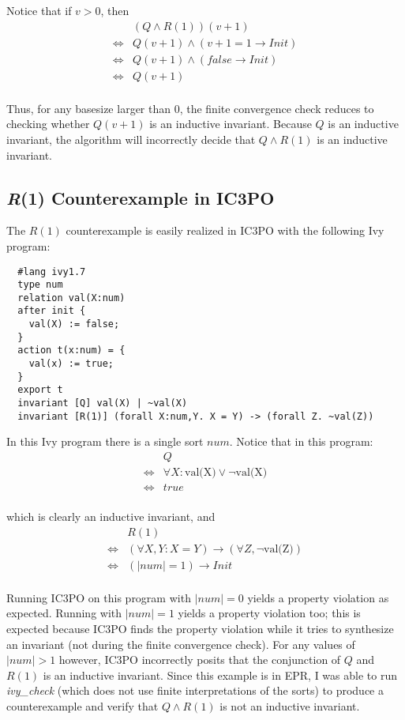 \documentclass[12pt]{article}
\begin{document}
Notice that if $v>0$, then
\begin{align*}
  &(Q \land R(1))(v+1)\\
  \iff &Q(v+1) \land (v+1=1 \rightarrow Init)\\
  \iff &Q(v+1) \land (false \rightarrow Init)\\
  \iff &Q(v+1)\\
\end{align*}

Thus, for any basesize larger than 0, the finite convergence check reduces to checking whether $Q(v+1)$ is an inductive invariant.  Because $Q$ is an inductive invariant, the algorithm will incorrectly decide that $Q \land R(1)$ is an inductive invariant.

\subsection{\textit{R}(1) Counterexample in IC3PO}
The $R(1)$ counterexample is easily realized in IC3PO with the following Ivy program:

\begin{verbatim}
  #lang ivy1.7
  type num
  relation val(X:num)
  after init {
    val(X) := false;
  }
  action t(x:num) = {
    val(x) := true;
  }
  export t
  invariant [Q] val(X) | ~val(X)
  invariant [R(1)] (forall X:num,Y. X = Y) -> (forall Z. ~val(Z))
\end{verbatim}

In this Ivy program there is a single sort $num$.  Notice that in this program:
\begin{align*}
  &Q\\
  \iff &\forall X: \text{val(X)} \lor \neg\text{val(X)}\\
  \iff &true\\
\end{align*}

which is clearly an inductive invariant, and
\begin{align*}
  &R(1)\\
  \iff &(\forall X,Y: X=Y) \rightarrow (\forall Z, \neg\text{val(Z)})\\
  \iff &(|num|=1) \rightarrow Init\\
\end{align*}

Running IC3PO on this program with $|num|=0$ yields a property violation as expected.  Running with $|num|=1$ yields a property violation too; this is expected because IC3PO finds the property violation while it tries to synthesize an invariant (not during the finite convergence check).  For any values of $|num|>1$ however, IC3PO incorrectly posits that the conjunction of $Q$ and $R(1)$ is an inductive invariant.  Since this example is in EPR, I was able to run \textit{ivy\_check} (which does not use finite interpretations of the sorts) to produce a counterexample and verify that $Q \land R(1)$ is not an inductive invariant.
\end{document}
